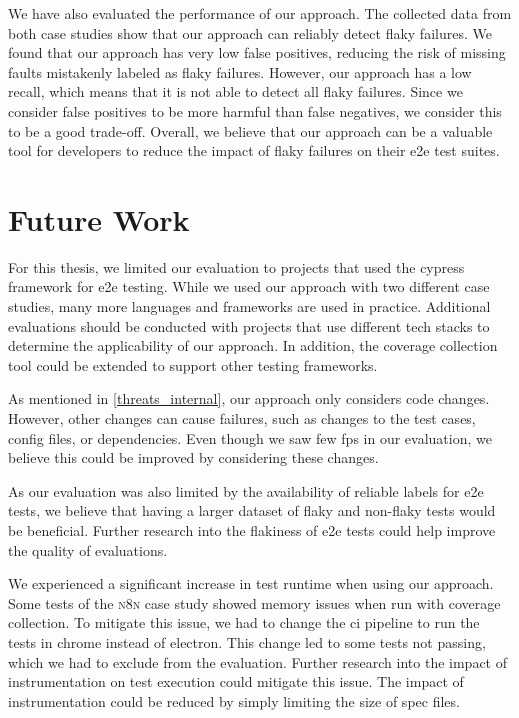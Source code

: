 We have also evaluated the performance of our approach.
The collected data from both case studies show that our approach can reliably detect flaky failures.
We found that our approach has very low false positives, reducing the risk of missing faults mistakenly labeled as flaky failures.
However, our approach has a low recall, which means that it is not able to detect all flaky failures.
Since we consider false positives to be more harmful than false negatives, we consider this to be a good trade-off.
Overall, we believe that our approach can be a valuable tool for developers to reduce the impact of flaky failures on their \ac{e2e} test suites.

\section{Future Work}
For this thesis, we limited our evaluation to projects that used the cypress framework for \ac{e2e} testing.
While we used our approach with two different case studies, many more languages and frameworks are used in practice.
Additional evaluations should be conducted with projects that use different tech stacks to determine the applicability of our approach.
In addition, the coverage collection tool could be extended to support other testing frameworks.

As mentioned in \cref{threats_internal}, our approach only considers code changes.
However, other changes can cause failures, such as changes to the test cases, config files, or dependencies.
Even though we saw few \aclp{fp} in our evaluation, we believe this could be improved by considering these changes.

As our evaluation was also limited by the availability of reliable labels for \ac{e2e} tests, we believe that having a larger dataset of flaky and non-flaky tests would be beneficial.
Further research into the flakiness of \ac{e2e} tests could help improve the quality of evaluations.

We experienced a significant increase in test runtime when using our approach.
Some tests of the \textsc{n8n} case study showed memory issues when run with coverage collection.
To mitigate this issue, we had to change the \ac{ci} pipeline to run the tests in chrome instead of electron.
This change led to some tests not passing, which we had to exclude from the evaluation.
Further research into the impact of instrumentation on test execution could mitigate this issue.
The impact of instrumentation could be reduced by simply limiting the size of spec files.

